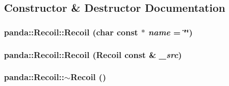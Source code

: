 \subsection{Constructor \& Destructor Documentation}
\hypertarget{classpanda_1_1Recoil_ae38679b784d64ddfffc1027994f856ac}{
\subsubsection[{Recoil}]{\setlength{\rightskip}{0pt plus 5cm}panda::Recoil::Recoil (char const $\ast$ {\em name} = {\ttfamily \char`\"{}\char`\"{}})}}
\label{classpanda_1_1Recoil_ae38679b784d64ddfffc1027994f856ac}
\hypertarget{classpanda_1_1Recoil_af28e5fecb3cb7a4b8f0599d34cb5733c}{
\subsubsection[{Recoil}]{\setlength{\rightskip}{0pt plus 5cm}panda::Recoil::Recoil ({\bf Recoil} const \& {\em \_\-src})}}
\label{classpanda_1_1Recoil_af28e5fecb3cb7a4b8f0599d34cb5733c}
\hypertarget{classpanda_1_1Recoil_a17606ae5f7e5fa468ca67ba597d734aa}{
\subsubsection[{$\sim$Recoil}]{\setlength{\rightskip}{0pt plus 5cm}panda::Recoil::$\sim$Recoil ()}}
\label{classpanda_1_1Recoil_a17606ae5f7e5fa468ca67ba597d734aa}


